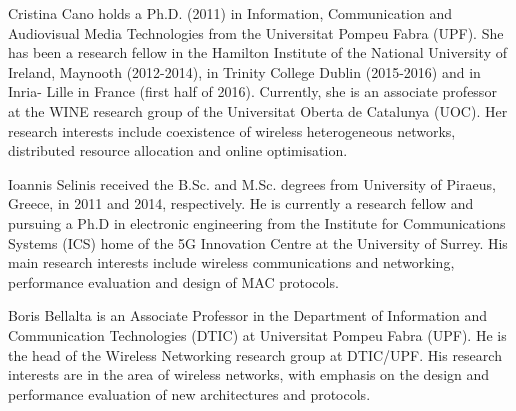 \documentclass[comsoc]{IEEEtran}
\begin{document}
	\begin{IEEEbiography}{Cristina Cano} holds a Ph.D. (2011) in Information, Communication and Audiovisual Media Technologies from the Universitat Pompeu Fabra (UPF). She has been a research fellow in the Hamilton Institute of the National University of Ireland, Maynooth (2012-2014), in Trinity College Dublin (2015-2016) and in Inria- Lille in France (first half of 2016). Currently, she is an associate professor at the WINE research group of the Universitat Oberta de Catalunya (UOC). Her research interests include coexistence of wireless heterogeneous networks, distributed resource allocation and online optimisation. 
	\end{IEEEbiography}
	
	\begin{IEEEbiography}{Ioannis Selinis} received the B.Sc. and M.Sc. degrees from University of Piraeus, Greece, in 2011 and 2014, respectively. He is currently a research fellow and pursuing a Ph.D in electronic engineering from the Institute for Communications Systems (ICS) home of the 5G Innovation Centre at the University of Surrey. His main research interests include wireless communications and networking, performance evaluation and design of MAC protocols.
	\end{IEEEbiography}

	\begin{IEEEbiography}{Boris Bellalta} is an Associate Professor in the Department of Information and Communication Technologies (DTIC) at Universitat Pompeu Fabra (UPF). He is the head of the Wireless Networking research group at DTIC/UPF. His research interests are in the area of wireless networks, with emphasis on the design and performance evaluation of new architectures and protocols.
	\end{IEEEbiography}
\end{document}
